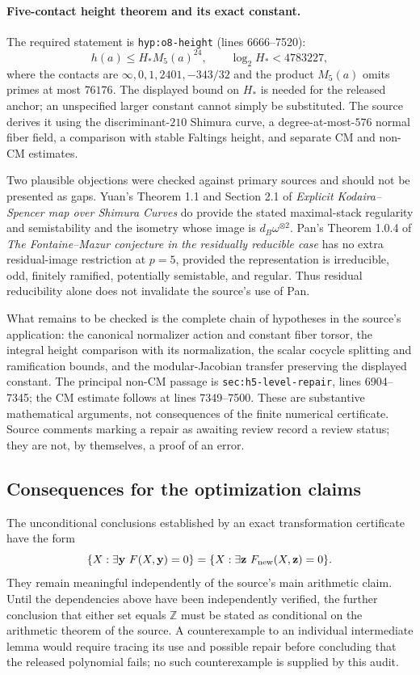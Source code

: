 \documentclass[11pt]{article}
\theoremstyle{definition}
\begin{document}
\paragraph{Five-contact height theorem and its exact constant.}
The required statement is \texttt{hyp:o8-height}
(lines 6666--7520):
\[
 h(a)\le H_*M_5(a)^{24},\qquad \log_2H_*<4783227,
\]
where the contacts are $\infty,0,1,2401,-343/32$ and the product
$M_5(a)$ omits primes at most $76176$.
The displayed bound on $H_*$ is needed for the released anchor;
an unspecified larger constant cannot simply be substituted.
The source derives it using the discriminant-$210$ Shimura curve,
a degree-at-most-$576$ normal fiber field, a comparison with stable
Faltings height, and separate CM and non-CM estimates.

Two plausible objections were checked against primary sources and
should not be presented as gaps.  Yuan's Theorem 1.1 and Section 2.1
of \emph{Explicit Kodaira--Spencer map over Shimura Curves}
\cite[Theorem 1.1 and Section 2.1]{Yuan2024} do provide the stated maximal-stack
regularity and semistability and the isometry whose image is
$d_B\omega^{\otimes2}$.  Pan's Theorem 1.0.4 of
\emph{The Fontaine--Mazur conjecture in the residually reducible case}
\cite[Theorem 1.0.4]{Pan2022} has no extra residual-image restriction
at $p=5$, provided the representation is irreducible, odd, finitely
ramified, potentially semistable, and regular.  Thus residual
reducibility alone does not invalidate the source's use of Pan.

What remains to be checked is the complete chain of hypotheses in the
source's application: the canonical normalizer action and constant
fiber torsor, the integral height comparison with its normalization,
the scalar cocycle splitting and ramification bounds, and the
modular-Jacobian transfer preserving the displayed constant.
The principal non-CM passage is
\texttt{sec:h5-level-repair}, lines 6904--7345; the CM estimate follows
at lines 7349--7500.  These are substantive mathematical arguments,
not consequences of the finite numerical certificate.  Source comments
marking a repair as awaiting review record a review status; they are
not, by themselves, a proof of an error.

\subsection{Consequences for the optimization claims}

The unconditional conclusions established by an exact transformation
certificate have the form
\[
 \{X:\exists\mathbf y\ F(X,\mathbf y)=0\}
 =\{X:\exists\mathbf z\ F_{\rm new}(X,\mathbf z)=0\}.
\]
They remain meaningful independently of the source's main arithmetic
claim.  Until the dependencies above have been independently verified,
the further conclusion that either set equals $\mathbb Z$ must be
stated as conditional on the arithmetic theorem of the source.
A counterexample to an individual intermediate lemma would require
tracing its use and possible repair before concluding that the released
polynomial fails; no such counterexample is supplied by this audit.
\end{document}
